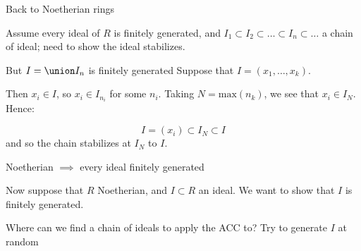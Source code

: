\documentclass{beamer}
\begin{document}
\begin{frame}{Back to Noetherian rings}

Assume every ideal of $R$ is finitely generated, and $I_1\subset I_2\subset\dots \subset I_n\subset\dots $ a chain of ideal; need to show the ideal stabilizes.

\begin{block}{But $I=\union I_n$ is finitely generated}
Suppose that $I=(x_1,\dots, x_k)$.  
\end{block}

Then $x_i\in I$, so $x_i\in I_{n_i}$ for some $n_i$.  Taking $N=\textrm{max}(n_k)$, we see that $x_i\in I_N$.  Hence:

$$I=(x_i)\subset I_N\subset I$$
and so the chain stabilizes at $I_N$ to $I$.
\end{frame}

\begin{frame}{Noetherian $\implies$ every ideal finitely generated}

Now suppose that $R$ Noetherian, and $I\subset R$ an ideal.  We want to show that $I$ is finitely generated.  

\begin{block}{Where can we find a chain of ideals to apply the ACC to?}
Try to generate $I$ at random
\end{block}



\end{frame}
\end{document}
